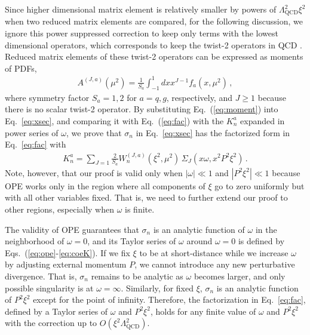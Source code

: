 \documentclass[twocolumn,aps,prl,superscriptaddress,nofootinbib,showpacs]{revtex4-1}
\begin{document}
Since higher dimensional matrix element is relatively smaller by powers of $\Lambda_{\text{QCD}}^2\xi^2$ when two reduced matrix elements are compared, for the following discussion, we ignore this power suppressed correction to keep only terms with the lowest dimensional operators, which corresponds to keep the twist-2 operators in QCD \cite{Collins:1984xc}. Reduced matrix elements of these twist-2 operators can be expressed as moments of PDFs,
\begin{align}\label{eq:moment}
A^{(J,a)}(\mu^2)=\frac{1}{S_a}\int_{-1}^1 d x x^{J-1} f_{a}(x,\mu^2)\, ,
\end{align}
where symmetry factor $S_a=1,2$ for $a=q,g$, respectively, and $J\geq1$ because there is no scalar twist-2 operator. By substituting Eq.~(\ref{eq:moment}) into Eq.~\eqref{eq:xsec}, and comparing it with Eq.~(\ref{eq:fac}) with the $K_n^a$ expanded in power series of $\omega$, we prove that $\sigma_n$ in Eq.~\eqref{eq:xsec} has the factorized form in Eq.~\eqref{eq:fac} with
\begin{align}\label{eq:coeK}
K_{n}^a=\sum_{J=1} \frac{2}{S_a} W_{n}^{(J,a)}(\xi^2,\mu^2)\, \Sigma_J(x \omega,x^2P^2 \xi^2)\, .
\end{align}
Note, however, that our proof is valid only when $|\omega|\ll1$ and $|P^2\xi^2|\ll1$ because OPE works only in the region where all components of $\xi$ go to zero uniformly but with all other variables fixed.
That is, we need to further extend our proof to other regions, especially when $\omega$ is finite.

The validity of OPE guarantees that ${\sigma}_{n}$ is an analytic function of $\omega$ in the neighborhood of $\omega=0$, and its Taylor series of $\omega$ around $\omega=0$ is defined by Eqs.~(\ref{eq:ope}-\ref{eq:coeK}). If we fix $\xi$ to be at short-distance while we increase $\omega$ by adjusting external momentum $P$, we cannot introduce any new perturbative divergence.  That is, ${\sigma}_{n}$ remains to be analytic as $\omega$ becomes larger, and only possible singularity is at $\omega=\infty$. Similarly, for fixed $\xi$, ${\sigma}_{n}$ is an analytic function of $P^2\xi^2$ except for the point of infinity. Therefore, the factorization in Eq.~\eqref{eq:fac}, defined by a Taylor series of $\omega$ and $P^2\xi^2$, holds for any finite value of $\omega$ and $P^2\xi^2$ with the correction up to $O(\xi^2\Lambda_{\text{QCD}}^2)$.
\end{document}
